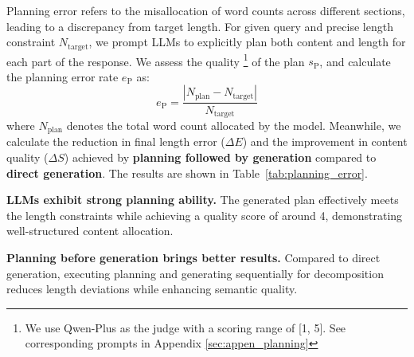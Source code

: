 Planning error refers to the misallocation of word counts across different sections, leading to a discrepancy from target length. For given query and precise length constraint \( N_{\mathrm{target}} \), 
we prompt LLMs to explicitly plan both content and length for each part of the response.
We assess the quality \footnote{We use Qwen-Plus \citep{qwen25} as the judge with a scoring range of [1, 5]. See corresponding prompts in Appendix \ref{sec:appen_planning}} of the plan $s_{\text{P}}$, and calculate the planning error rate $e_{\text{P}}$ as:
\begin{equation}
e_{\text{P}}= \frac{|N_{\mathrm{plan}} - N_{\mathrm{target}}|}{N_{\mathrm{target}}} 
\label{eq:e3}
\end{equation}
where \( N_{\mathrm{plan}} \) denotes the total word count allocated by the model.
Meanwhile, we calculate the reduction in final length error (\(\Delta E\)) and the improvement in content quality (\(\Delta S\)) achieved by \textbf{planning followed by generation} compared to \textbf{direct generation}.
The results are shown in Table~\ref{tab:planning_error}.

\begin{finding}
\label{find5}
\textbf{LLMs exhibit strong planning ability.} 
The generated plan effectively meets the length constraints while achieving a quality score of around 4, demonstrating well-structured content allocation.
\end{finding}
\begin{finding}
\label{find6}
\textbf{Planning before generation brings better results.} Compared to direct generation, executing planning and generating sequentially for decomposition reduces length deviations while enhancing semantic quality.
\end{finding}


